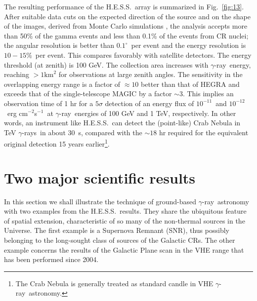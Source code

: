 \documentclass{svjour3x}                     %
\newcommand{\gr}{$\gamma$-ray}
\newcommand{\grs}{$\gamma$-rays}
\newcommand{\hess}{H.E.S.S.}
\begin{document}
The resulting performance of the \hess\ array is summarized in
Fig.~\ref{fig:13}. After suitable data cuts on the expected direction of the
source and on the shape of the images, derived from Monte Carlo simulations
\cite{hesscrab}, the analysis accepts more than 50\% of the gamma events and
less than 0.1\% of the events from CR nuclei; the angular resolution is better
than $0.1^{\circ}$~per event and the energy resolution is $10 - 15$\%~per
event. This compares favorably with satellite detectors. The energy threshold
(at zenith) is 100 GeV. The collection area increases with \gr\ energy,
reaching $> 1 \mathrm{km}^2$ for observations at large zenith angles.  The
sensitivity in the overlapping energy range is a factor of $\approx 10$ better
than that of HEGRA and exceeds that of the single-telescope MAGIC by a factor
$\sim 3$. This implies an observation time of 1 hr for a $5 \sigma$ detection
of an energy flux of $10^{-11}$~and $10^{-12}$~erg cm$^{-2}$s$^{-1}$~at \gr\
energies of 100 GeV and 1 TeV, respectively. In other words, an instrument like
\hess\ can detect the (point-like) Crab Nebula in TeV \grs\ in about 30~s,
compared with the $\sim 18$ hr required for the equivalent original detection
15 years earlier\footnote{The Crab Nebula is generally treated as standard
  candle in VHE \gr\ astronomy.}.


\section{Two major scientific results}

In this section we shall illustrate the technique of ground-based \gr\ astronomy
with two examples from the \hess\ results. They share the ubiquitous
feature of spatial extension, characteristic of so many of the non-thermal
sources in the Universe. The first example is a Supernova Remnant (SNR), thus
possibly belonging to the long-sought class of sources of the Galactic CRs. The
other example concerns the results of the Galactic Plane scan in the VHE range
that has been performed since 2004.
\end{document}
